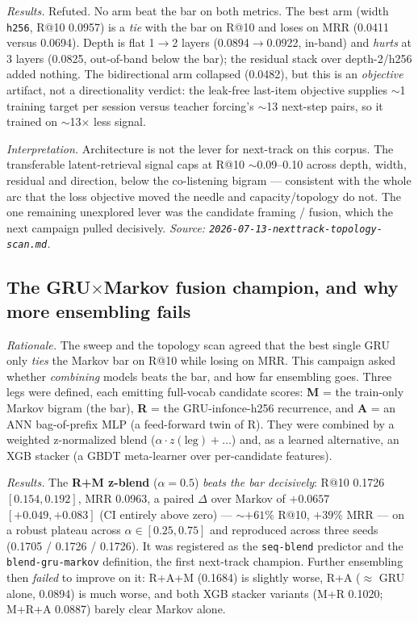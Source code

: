 \documentclass[11pt]{article}
\begin{document}
\emph{Results.} Refuted. No arm beat the bar on both metrics. The best arm
(width \texttt{h256}, R@10 \num{0.0957}) is a \emph{tie} with the bar on R@10
and loses on MRR (\num{0.0411} versus \num{0.0694}). Depth is flat 1$\to$2
layers (\num{0.0894}$\to$\num{0.0922}, in-band) and \emph{hurts} at 3 layers
(\num{0.0825}, out-of-band below the bar); the residual stack over depth-2/h256
added nothing. The bidirectional arm collapsed (\num{0.0482}), but this is an
\emph{objective} artifact, not a directionality verdict: the leak-free last-item
objective supplies $\sim$1 training target per session versus teacher forcing's
$\sim$13 next-step pairs, so it trained on $\sim$13$\times$ less signal.

\emph{Interpretation.} Architecture is not the lever for next-track on this
corpus. The transferable latent-retrieval signal caps at R@10 $\sim$0.09--0.10
across depth, width, residual and direction, below the co-listening bigram ---
consistent with the whole arc that the loss objective moved the needle and
capacity/topology do not. The one remaining unexplored lever was the candidate
framing / fusion, which the next campaign pulled decisively.
\emph{Source: \texttt{2026-07-13-nexttrack-topology-scan.md}.}

\subsection{The GRU$\times$Markov fusion champion, and why more ensembling fails}
\label{sec:nexttrack-blend}
\emph{Rationale.} The sweep and the topology scan agreed that the best single
GRU only \emph{ties} the Markov bar on R@10 while losing on MRR. This campaign
asked whether \emph{combining} models beats the bar, and how far ensembling
goes. Three legs were defined, each emitting full-vocab candidate scores:
\textbf{M} = the train-only Markov bigram (the bar), \textbf{R} = the
GRU-infonce-h256 recurrence, and \textbf{A} = an ANN bag-of-prefix MLP (a
feed-forward twin of R). They were combined by a weighted z-normalized blend
($\alpha\cdot z(\text{leg})+\dots$) and, as a learned alternative, an XGB
stacker (a GBDT meta-learner over per-candidate features).

\emph{Results.} The \textbf{R+M z-blend} ($\alpha{=}0.5$) \emph{beats the bar
decisively}: R@10 \num{0.1726} $[0.154, 0.192]$, MRR \num{0.0963}, a paired
$\Delta$ over Markov of $+\num{0.0657}$ $[+0.049, +0.083]$ (CI entirely above
zero) --- $\sim$$+61\%$ R@10, $+39\%$ MRR --- on a robust plateau across
$\alpha \in [0.25, 0.75]$ and reproduced across three seeds (\num{0.1705} /
\num{0.1726} / \num{0.1726}). It was registered as the \texttt{seq-blend}
predictor and the \texttt{blend-gru-markov} definition, the first next-track
champion. Further ensembling then \emph{failed} to improve on it: R+A+M
(\num{0.1684}) is slightly worse, R+A ($\approx$ GRU alone, \num{0.0894}) is
much worse, and both XGB stacker variants (M+R \num{0.1020}; M+R+A \num{0.0887})
barely clear Markov alone.
\end{document}
